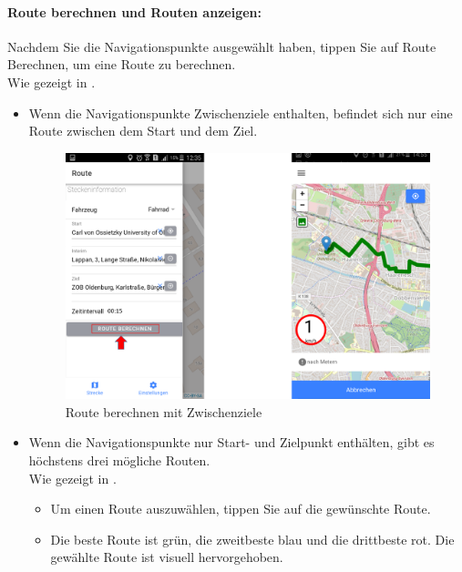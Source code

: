 \paragraph{Route berechnen und Routen anzeigen:}
Nachdem Sie die Navigationspunkte ausgewählt haben, tippen Sie auf Route Berechnen, um eine Route zu berechnen.\\
Wie gezeigt in .
\begin{itemize}
  \item Wenn die Navigationspunkte Zwischenziele enthalten, befindet sich nur eine Route zwischen dem Start und dem Ziel.
  
\begin{figure}[h!]
\centerline{\includegraphics[height=8 cm]{./ressourcen/nutzerhandbuch/route_berechnen_zwischen.png}}
\caption{Route berechnen mit Zwischenziele}
\label{fig:app:route_berechnen_zwischen}
\end{figure} 

  \item Wenn die Navigationspunkte nur Start- und Zielpunkt enthälten, gibt es höchstens drei mögliche Routen.\\
  Wie gezeigt in .
  	\begin{itemize}
  		\item Um einen Route auszuwählen, tippen Sie auf die gewünschte Route.

  		\item Die beste Route ist grün, die zweitbeste blau und die drittbeste rot. Die gewählte Route ist visuell hervorgehoben.
	\end{itemize}
	

\end{itemize}
